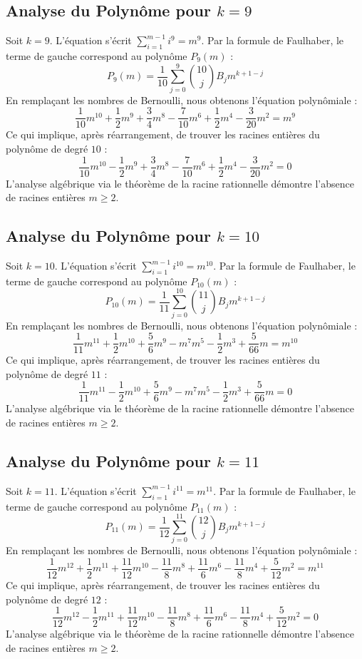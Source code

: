 \documentclass[11pt,a4paper]{article}
\begin{document}
\subsection{Analyse du Polynôme pour $k = 9$}
Soit $k = 9$. L'équation s'écrit $\sum_{i=1}^{m-1} i^{9} = m^{9}$.
Par la formule de Faulhaber, le terme de gauche correspond au polynôme $P_{9}(m)$ :
$$ P_{9}(m) = \frac{1}{10} \sum_{j=0}^{9} \binom{10}{j} B_j m^{k+1-j} $$
En remplaçant les nombres de Bernoulli, nous obtenons l'équation polynômiale :
$$ \frac{1}{10} m^10+\frac{1}{2} m^9+\frac{3}{4} m^8-\frac{7}{10} m^6+\frac{1}{2} m^4-\frac{3}{20} m^2 = m^{9} $$
Ce qui implique, après réarrangement, de trouver les racines entières du polynôme de degré $10$ :
$$ \frac{1}{10} m^10-\frac{1}{2} m^9+\frac{3}{4} m^8-\frac{7}{10} m^6+\frac{1}{2} m^4-\frac{3}{20} m^2 = 0 $$
L'analyse algébrique via le théorème de la racine rationnelle démontre l'absence de racines entières $m \geq 2$.

\subsection{Analyse du Polynôme pour $k = 10$}
Soit $k = 10$. L'équation s'écrit $\sum_{i=1}^{m-1} i^{10} = m^{10}$.
Par la formule de Faulhaber, le terme de gauche correspond au polynôme $P_{10}(m)$ :
$$ P_{10}(m) = \frac{1}{11} \sum_{j=0}^{10} \binom{11}{j} B_j m^{k+1-j} $$
En remplaçant les nombres de Bernoulli, nous obtenons l'équation polynômiale :
$$ \frac{1}{11} m^11+\frac{1}{2} m^10+\frac{5}{6} m^9-m^7m^5-\frac{1}{2} m^3+\frac{5}{66} m = m^{10} $$
Ce qui implique, après réarrangement, de trouver les racines entières du polynôme de degré $11$ :
$$ \frac{1}{11} m^11-\frac{1}{2} m^10+\frac{5}{6} m^9-m^7m^5-\frac{1}{2} m^3+\frac{5}{66} m = 0 $$
L'analyse algébrique via le théorème de la racine rationnelle démontre l'absence de racines entières $m \geq 2$.

\subsection{Analyse du Polynôme pour $k = 11$}
Soit $k = 11$. L'équation s'écrit $\sum_{i=1}^{m-1} i^{11} = m^{11}$.
Par la formule de Faulhaber, le terme de gauche correspond au polynôme $P_{11}(m)$ :
$$ P_{11}(m) = \frac{1}{12} \sum_{j=0}^{11} \binom{12}{j} B_j m^{k+1-j} $$
En remplaçant les nombres de Bernoulli, nous obtenons l'équation polynômiale :
$$ \frac{1}{12} m^12+\frac{1}{2} m^11+\frac{11}{12} m^10-\frac{11}{8} m^8+\frac{11}{6} m^6-\frac{11}{8} m^4+\frac{5}{12} m^2 = m^{11} $$
Ce qui implique, après réarrangement, de trouver les racines entières du polynôme de degré $12$ :
$$ \frac{1}{12} m^12-\frac{1}{2} m^11+\frac{11}{12} m^10-\frac{11}{8} m^8+\frac{11}{6} m^6-\frac{11}{8} m^4+\frac{5}{12} m^2 = 0 $$
L'analyse algébrique via le théorème de la racine rationnelle démontre l'absence de racines entières $m \geq 2$.
\end{document}
